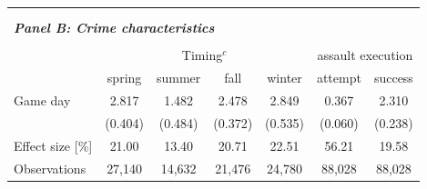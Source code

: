 \begin{table}[ht]
\begin{threeparttable}
{\begin{tabular}{l*{6}{c}}
				\\\\\\
				\multicolumn{6}{l}{\textit{\textbf{Panel B: Crime characteristics}}} \\\\
				& \multicolumn{4}{c}{Timing$^c$} & \multicolumn{2}{c}{assault execution} \\
				\cmidrule(lr){2-5} \cmidrule(lr){6-7}
				& spring & summer & fall & winter & attempt & success \\
				\midrule
				Game day            	 &     2.817\sym{***}&       1.482\sym{**} &       2.478\sym{***}&       2.849\sym{***}&       0.367\sym{***}&       2.310\sym{***}\\
										 &   (0.404)         &     (0.484)         &     (0.372)         &     (0.535)         &     (0.060)         &     (0.238)         \\
				Effect size [\%]&     21.00         &       13.40         &       20.71         &       22.51         &       56.21         &       19.58         \\
				Observations        	 &    27,140         &      14,632         &      21,476         &      24,780         &      88,028         &      88,028         \\
				

\end{tabular}}
\end{threeparttable}
\end{table}
